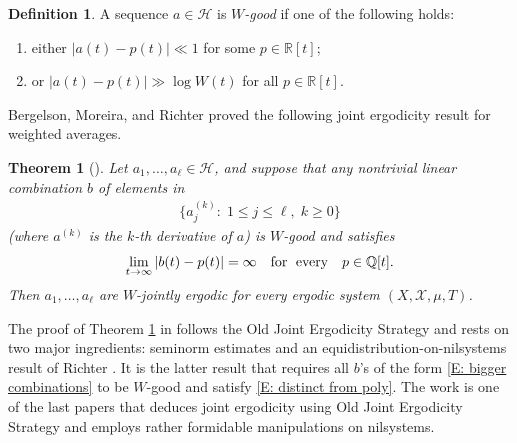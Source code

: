 \documentclass[11pt]{amsart}
\newtheorem{theorem}[lemma]{Theorem}
\theoremstyle{definition}
\newtheorem{definition}[lemma]{Definition}
\newcommand{\Q}{{\mathbb Q}}
\newcommand{\R}{{\mathbb R}}
\newcommand{\CH}{{\mathcal H}}
\newcommand{\CX}{{\mathcal X}}
\newcommand{\1}{{\mathbf{1}}}
\begin{document}
    \begin{definition}
        A sequence $a\in\CH$ is \emph{$W$-good} if one of the following holds:
        \begin{enumerate}
            \item either $|a(t)-p(t)|\ll 1$ for some $p\in\R[t]$;
            \item or $|a(t)-p(t)|\gg \log W(t)$ for all $p\in\R[t]$.
        \end{enumerate}
    \end{definition}
    Bergelson, Moreira, and Richter proved the following joint ergodicity result for weighted averages.
    \begin{theorem}%
    [{\cite[Theorem B(ii)]{BMR20}}]\label{T: BMR weighted}
        Let $a_1, \ldots, a_\ell\in \CH$, and suppose that any nontrivial linear combination $b$ of elements in
        \begin{align}\label{E: bigger combinations}
            \{a_j^{(k)}:\; 1\leq j\leq \ell,\; k\geq 0\}
        \end{align}
        (where $a^{(k)}$ is the $k$-th derivative of $a$) is $W$-good and satisfies
        \begin{align}\label{E: distinct from poly}
            \lim\limits_{t\to\infty}|b(t)-p(t)|=\infty\quad \textrm{for\; every}\quad p\in\Q[t].
        \end{align}
                 Then $a_1, \ldots, a_\ell$ are $W$-jointly ergodic for every ergodic system $(X, \CX, \mu, T)$. 
    \end{theorem}
        The proof of Theorem \ref{T: BMR weighted} in \cite{BMR20} follows the Old Joint Ergodicity Strategy and rests on two major ingredients: seminorm estimates and an equidistribution-on-nilsystems result of Richter \cite{R22}. It is the latter result that requires all $b$'s of the form \eqref{E: bigger combinations} to be $W$-good and satisfy \eqref{E: distinct from poly}. The work \cite{BMR20} is one of the last papers that deduces joint ergodicity using Old Joint Ergodicity Strategy and employs rather formidable manipulations on nilsystems.
        
\end{document}
